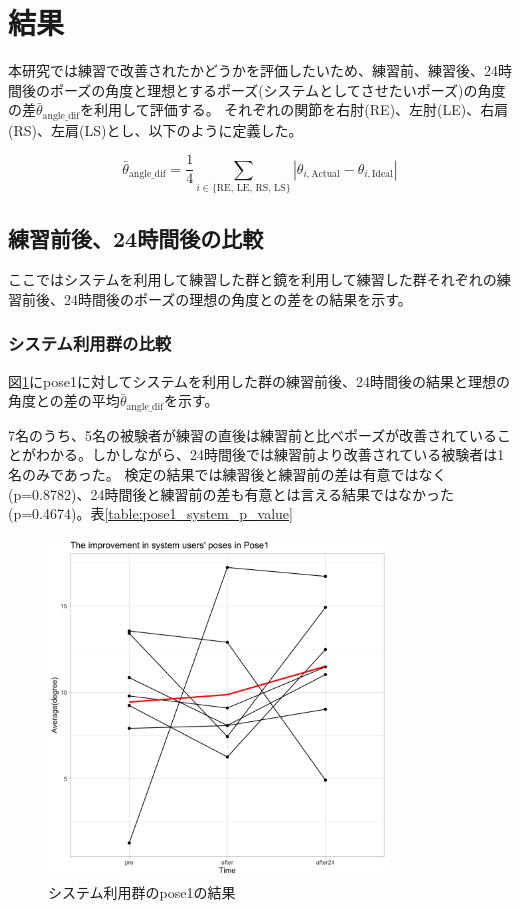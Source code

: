 \section{結果}
  本研究では練習で改善されたかどうかを評価したいため、練習前、練習後、24時間後のポーズの角度と理想とするポーズ(システムとしてさせたいポーズ)の角度の差\(\bar{\theta}_{\text{angle\_dif}}\)を利用して評価する。
  それぞれの関節を右肘(RE)、左肘(LE)、右肩(RS)、左肩(LS)とし、以下のように定義した。

  \[
    \bar{\theta}_{\text{angle\_dif}} = \frac{1}{4} \sum_{i \in \{\text{RE, LE, RS, LS}\}} |\theta_{i, \text{Actual}} - \theta_{i, \text{Ideal}}|
  \]

  \subsection{練習前後、24時間後の比較}
    ここではシステムを利用して練習した群と鏡を利用して練習した群それぞれの練習前後、24時間後のポーズの理想の角度との差をの結果を示す。
    \subsubsection{システム利用群の比較}
      図\ref{fig:pose1_system}にpose1に対してシステムを利用した群の練習前後、24時間後の結果と理想の角度との差の平均\(\bar{\theta}_{\text{angle\_dif}}\)を示す。


      7名のうち、5名の被験者が練習の直後は練習前と比べポーズが改善されていることがわかる。しかしながら、24時間後では練習前より改善されている被験者は1名のみであった。
      検定の結果では練習後と練習前の差は有意ではなく(p=0.8782)、24時間後と練習前の差も有意とは言える結果ではなかった(p=0.4674)。表\ref{table:pose1_system_p_value}

      \begin{figure}[H]
        \begin{center}
        \includegraphics[width=9cm]{figures/pose1_system_true_graph.png}
        \caption{システム利用群のpose1の結果}
        \label{fig:pose1_system}
        \end{center}
      \end{figure}

